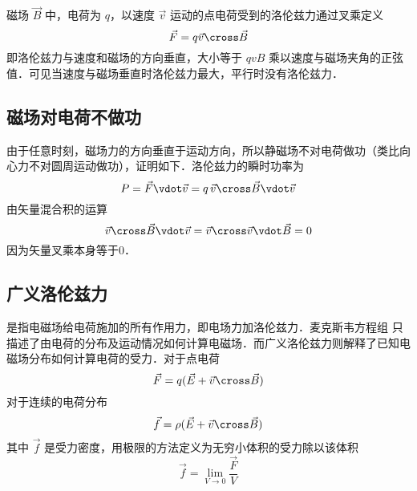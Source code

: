 
磁场 $\vec B$ 中，电荷为 $q$，以速度 $\vec v$ 运动的点电荷受到的洛伦兹力通过叉乘定义
\begin{equation}
\vec F = q\vec v \cross \vec B
\end{equation}
即洛伦兹力与速度和磁场的方向垂直，大小等于 $qvB$ 乘以速度与磁场夹角的正弦值．可见当速度与磁场垂直时洛伦兹力最大，平行时没有洛伦兹力．

\subsection{磁场对电荷不做功}
由于任意时刻，磁场力的方向垂直于运动方向，所以静磁场不对电荷做功（类比向心力不对圆周运动做功），证明如下．洛伦兹力的瞬时功率为
\begin{equation}
P = \vec F \vdot \vec v = q\,\vec v \cross \vec B \vdot \vec v
\end{equation}
由矢量混合积的运算 %
\begin{equation}
\vec v \cross \vec B \vdot \vec v = \vec v \cross \vec v \vdot \vec B = 0
\end{equation}
因为矢量叉乘本身等于0．


\subsection{广义洛伦兹力}
 是指电磁场给电荷施加的所有作用力，即电场力加洛伦兹力．麦克斯韦方程组%
只描述了由电荷的分布及运动情况如何计算电磁场．而广义洛伦兹力则解释了已知电磁场分布如何计算电荷的受力．对于点电荷
\begin{equation}
\vec F = q (\vec E + \vec v \cross \vec B)
\end{equation}
对于连续的电荷分布
\begin{equation}
\vec f = \rho(\vec E + \vec v \cross \vec B)
\end{equation}
其中 $\vec f$ 是受力密度，用极限的方法定义为无穷小体积的受力除以该体积
\begin{equation}
\vec f = \lim_{V \to 0} \frac{\vec F}{V}
\end{equation}

